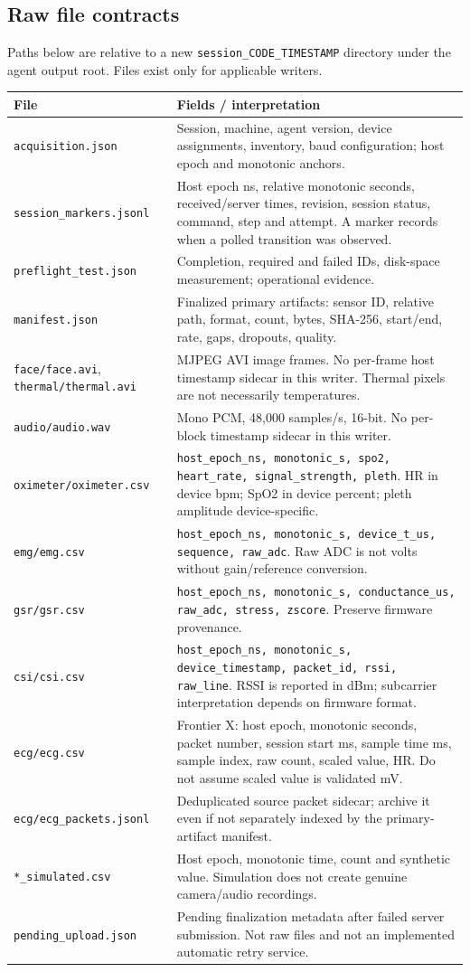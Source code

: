 \documentclass[11pt,a4paper]{article}
\newcommand{\code}[1]{{\small\nolinkurl{#1}}}
\begin{document}
\subsection{Raw file contracts}
Paths below are relative to a new \code{session_CODE_TIMESTAMP} directory under the agent output root. Files exist only for applicable writers.
\small
\begin{longtable}{@{}L{.31\textwidth}L{.62\textwidth}@{}}
\toprule File & Fields / interpretation\\\midrule\endhead
\code{acquisition.json} & Session, machine, agent version, device assignments, inventory, baud configuration; host epoch and monotonic anchors.\\
\code{session_markers.jsonl} & Host epoch ns, relative monotonic seconds, received/server times, revision, session status, command, step and attempt. A marker records when a polled transition was observed.\\
\code{preflight_test.json} & Completion, required and failed IDs, disk-space measurement; operational evidence.\\
\code{manifest.json} & Finalized primary artifacts: sensor ID, relative path, format, count, bytes, SHA-256, start/end, rate, gaps, dropouts, quality.\\
\code{face/face.avi}, \code{thermal/thermal.avi} & MJPEG AVI image frames. No per-frame host timestamp sidecar in this writer. Thermal pixels are not necessarily temperatures.\\
\code{audio/audio.wav} & Mono PCM, 48,000 samples/s, 16-bit. No per-block timestamp sidecar in this writer.\\
\code{oximeter/oximeter.csv} & \code{host_epoch_ns, monotonic_s, spo2, heart_rate, signal_strength, pleth}. HR in device bpm; SpO2 in device percent; pleth amplitude device-specific.\\
\code{emg/emg.csv} & \code{host_epoch_ns, monotonic_s, device_t_us, sequence, raw_adc}. Raw ADC is not volts without gain/reference conversion.\\
\code{gsr/gsr.csv} & \code{host_epoch_ns, monotonic_s, conductance_us, raw_adc, stress, zscore}. Preserve firmware provenance.\\
\code{csi/csi.csv} & \code{host_epoch_ns, monotonic_s, device_timestamp, packet_id, rssi, raw_line}. RSSI is reported in dBm; subcarrier interpretation depends on firmware format.\\
\code{ecg/ecg.csv} & Frontier X: host epoch, monotonic seconds, packet number, session start ms, sample time ms, sample index, raw count, scaled value, HR. Do not assume scaled value is validated mV.\\
\code{ecg/ecg_packets.jsonl} & Deduplicated source packet sidecar; archive it even if not separately indexed by the primary-artifact manifest.\\
\code{*_simulated.csv} & Host epoch, monotonic time, count and synthetic value. Simulation does not create genuine camera/audio recordings.\\
\code{pending_upload.json} & Pending finalization metadata after failed server submission. Not raw files and not an implemented automatic retry service.\\
\bottomrule
\end{longtable}
\end{document}
